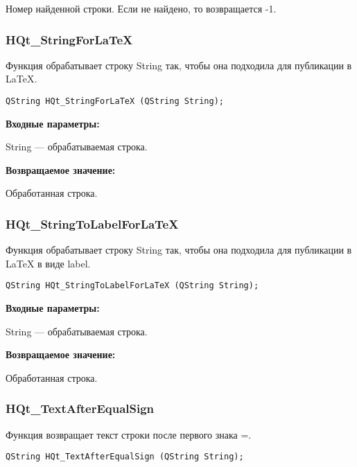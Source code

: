 \documentclass[a4paper,12pt]{article}
\begin{document}
Номер найденной строки. Если не найдено, то возвращается -1.


\subsubsection{HQt\_StringForLaTeX}\label{HQt_StringForLaTeX}

Функция обрабатывает строку String так, чтобы она подходила для публикации в LaTeX.


\begin{lstlisting}[label=code_syntax_HQt_StringForLaTeX,caption=Синтаксис]
QString HQt_StringForLaTeX (QString String);
\end{lstlisting}

\textbf{Входные параметры:}

String --- обрабатываемая строка.

\textbf{Возвращаемое значение:}
 
Обработанная строка.


\subsubsection{HQt\_StringToLabelForLaTeX}\label{HQt_StringToLabelForLaTeX}

Функция обрабатывает строку String так, чтобы она подходила для публикации в LaTeX в виде label.


\begin{lstlisting}[label=code_syntax_HQt_StringToLabelForLaTeX,caption=Синтаксис]
QString HQt_StringToLabelForLaTeX (QString String);
\end{lstlisting}

\textbf{Входные параметры:}

String --- обрабатываемая строка.

\textbf{Возвращаемое значение:}
 
Обработанная строка.


\subsubsection{HQt\_TextAfterEqualSign}\label{HQt_TextAfterEqualSign}

Функция возвращает текст строки после первого знака =.


\begin{lstlisting}[label=code_syntax_HQt_TextAfterEqualSign,caption=Синтаксис]
QString HQt_TextAfterEqualSign (QString String);
\end{lstlisting}
\end{document}
